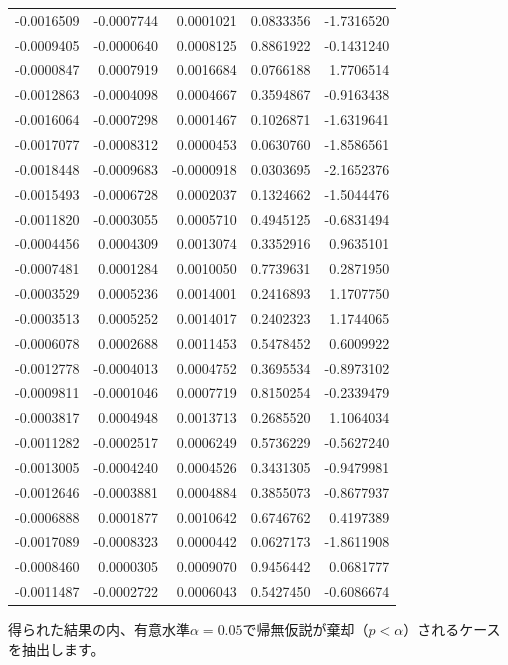 \documentclass[]{tufte-handout}
\begin{document}
\begin{longtable}[]{@{}rrrrr@{}}
-0.0016509 & -0.0007744 & 0.0001021 & 0.0833356 & -1.7316520 \\
-0.0009405 & -0.0000640 & 0.0008125 & 0.8861922 & -0.1431240 \\
-0.0000847 & 0.0007919 & 0.0016684 & 0.0766188 & 1.7706514 \\
-0.0012863 & -0.0004098 & 0.0004667 & 0.3594867 & -0.9163438 \\
-0.0016064 & -0.0007298 & 0.0001467 & 0.1026871 & -1.6319641 \\
-0.0017077 & -0.0008312 & 0.0000453 & 0.0630760 & -1.8586561 \\
-0.0018448 & -0.0009683 & -0.0000918 & 0.0303695 & -2.1652376 \\
-0.0015493 & -0.0006728 & 0.0002037 & 0.1324662 & -1.5044476 \\
-0.0011820 & -0.0003055 & 0.0005710 & 0.4945125 & -0.6831494 \\
-0.0004456 & 0.0004309 & 0.0013074 & 0.3352916 & 0.9635101 \\
-0.0007481 & 0.0001284 & 0.0010050 & 0.7739631 & 0.2871950 \\
-0.0003529 & 0.0005236 & 0.0014001 & 0.2416893 & 1.1707750 \\
-0.0003513 & 0.0005252 & 0.0014017 & 0.2402323 & 1.1744065 \\
-0.0006078 & 0.0002688 & 0.0011453 & 0.5478452 & 0.6009922 \\
-0.0012778 & -0.0004013 & 0.0004752 & 0.3695534 & -0.8973102 \\
-0.0009811 & -0.0001046 & 0.0007719 & 0.8150254 & -0.2339479 \\
-0.0003817 & 0.0004948 & 0.0013713 & 0.2685520 & 1.1064034 \\
-0.0011282 & -0.0002517 & 0.0006249 & 0.5736229 & -0.5627240 \\
-0.0013005 & -0.0004240 & 0.0004526 & 0.3431305 & -0.9479981 \\
-0.0012646 & -0.0003881 & 0.0004884 & 0.3855073 & -0.8677937 \\
-0.0006888 & 0.0001877 & 0.0010642 & 0.6746762 & 0.4197389 \\
-0.0017089 & -0.0008323 & 0.0000442 & 0.0627173 & -1.8611908 \\
-0.0008460 & 0.0000305 & 0.0009070 & 0.9456442 & 0.0681777 \\
-0.0011487 & -0.0002722 & 0.0006043 & 0.5427450 & -0.6086674 \\
\bottomrule
\end{longtable}

得られた結果の内、有意水準\(\alpha = 0.05\)で帰無仮説が棄却（\(p < \alpha\)）されるケースを抽出します。
\end{document}

